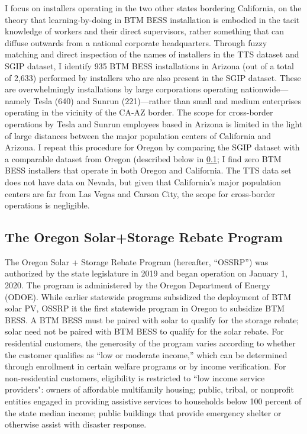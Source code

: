 I focus on installers operating in the two other states bordering California, on the theory that learning-by-doing in BTM BESS installation is embodied in the tacit knowledge of workers and their direct supervisors, rather something that can diffuse outwards from a national corporate headquarters. Through fuzzy matching and direct inspection of the names of installers in the TTS dataset and SGIP dataset, I identify 935 BTM BESS installations in Arizona (out of a total of 2,633) performed by installers who are also present in the SGIP dataset. These are overwhelmingly installations by large corporations operating nationwide---namely Tesla (640) and Sunrun (221)---rather than small and medium enterprises operating in the vicinity of the CA-AZ border. The scope for cross-border operations by Tesla and Sunrun employees based in Arizona is limited in the light of large distances between the major population centers of California and Arizona. I repeat this procedure for Oregon by comparing the SGIP dataset with a comparable dataset from Oregon (described below in \ref{apdx:data_ODOE}; I find zero BTM BESS installers that operate in both Oregon and California. The TTS data set does not have data on Nevada, but given that California's major population centers are far from Las Vegas and Carson City, the scope for cross-border operations is negligible.

\subsection{The Oregon Solar+Storage Rebate Program}\label{apdx:data_ODOE}

The Oregon Solar + Storage Rebate Program (hereafter, ``OSSRP'') was authorized by the state legislature in 2019 and began operation on January 1\Xst, 2020. The program is administered by the Oregon Department of Energy (ODOE).  While earlier statewide programs subsidized the deployment of BTM solar PV, OSSRP it the first statewide program in Oregon to subsidize BTM BESS. A BTM BESS must be paired with solar to qualify for the storage rebate; solar need not be paired with BTM BESS to qualify for the solar rebate. For residential customers, the generosity of the program varies according to whether the customer qualifies as ``low or moderate income,'' which can be determined through enrollment in certain welfare programs or by income verification. For non-residential customers, eligibility is restricted to ``low income service providers": owners of affordable multifamily housing; public, tribal, or nonprofit entities engaged in providing assistive services to households below 100 percent of the state median income; public buildings that provide emergency shelter or otherwise assist with disaster response.

